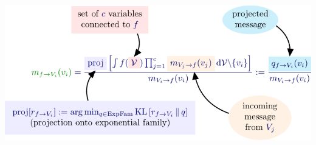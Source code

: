\documentclass[25pt, a0paper, portrait, margin=0mm, innermargin=10mm,
     blockverticalspace=7mm, colspace=8mm, subcolspace=8mm]{tikzposter} %
\DeclareMathOperator*{\proj}{\text{proj}} %
\begin{document}
\begin{columns}
{%



\begin{tikzfigure}[]
    \includegraphics[width=35cm]{img/inout_msg-crop.pdf}
\end{tikzfigure}

}
\end{columns}
\end{document}
